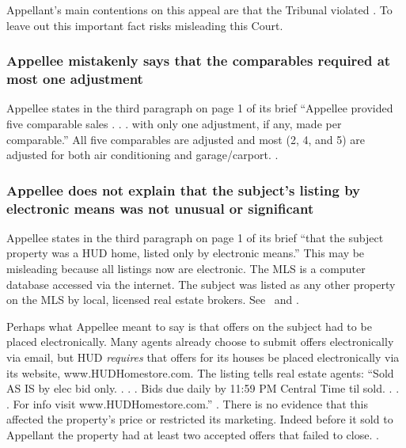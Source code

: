 \documentclass[12pt,\documentclassflag]{michiganCourtOfAppealsBrief}
\begin{document}
Appellant's main contentions on this appeal are that the Tribunal violated \mathieuGast. To leave out this important fact risks misleading this Court.

\subsubsection{Appellee mistakenly says that the comparables required at most one adjustment}

Appellee states in the third paragraph on page 1 of its brief ``Appellee provided five comparable sales . . . with only one adjustment, if any, made per comparable.'' All five comparables are adjusted and most (2, 4, and 5) are adjusted for both air conditioning and garage/carport. \cityEvidence[2].

\subsubsection{Appellee does not explain that the subject's listing by electronic means was not unusual or significant}


Appellee states in the third paragraph on page 1 of its brief ``that the subject property was a HUD home, listed only by electronic means.'' This may be misleading because all listings now are electronic. The MLS is a computer database accessed via the internet. The subject was listed as any other property on the MLS by local, licensed real estate brokers. See \mlsListing\ and \mlsHistory.

Perhaps what Appellee meant to say is that offers on the subject had to be placed electronically. Many agents already choose to submit offers electronically via email, but HUD {\em requires} that offers for its houses be placed electronically via its website, www.HUDHomestore.com. The listing tells real estate agents: ``Sold AS IS by elec bid only. . . . Bids due daily by 11:59 PM Central Time til sold. . . . For info visit www.HUDHomestore.com.'' \mlsListing. There is no evidence that this affected the property's price or restricted its marketing. Indeed before it sold to Appellant the property had at least two accepted offers that failed to close. \mlsHistory.

\end{document}

